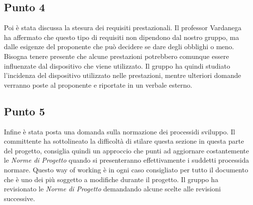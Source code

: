     \subsection{Punto 4}
        Poi è stata discussa la stesura dei requisiti prestazionali. Il professor Vardanega ha affermato che questo tipo di requisiti non dipendono dal nostro gruppo, ma dalle esigenze del proponente che può decidere se dare degli obblighi o meno. Bisogna tenere presente che alcune prestazioni potrebbero comunque essere influenzate dal dispositivo che viene utilizzato. Il gruppo ha quindi studiato l'incidenza del dispositivo utilizzato nelle prestazioni, mentre ulteriori domande verranno poste al proponente e riportate in un verbale esterno.
    \subsection{Punto 5}
        Infine è stata posta una domanda sulla normazione dei processi\glosp di sviluppo. Il committente ha sottolineato la difficoltà di stilare questa sezione in questa parte del progetto\glo, consiglia quindi un approccio che punti ad aggiornare costantemente le \textit{Norme di Progetto} quando si presenteranno effettivamente i suddetti processi\glosp da normare. Questo way of working è in ogni caso consigliato per tutto il documento che è uno dei più soggetto a modifiche durante il progetto\glo. Il gruppo ha revisionato le \textit{Norme di Progetto} demandando alcune scelte alle revisioni successive.